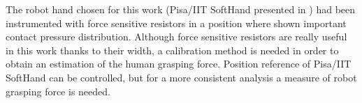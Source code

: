 The robot hand chosen for this work (Pisa/IIT SoftHand presented in \cite{catalano2014adaptive} ) had been instrumented with force sensitive resistors in a position where \cite{knoop2017handshakiness} shown important contact pressure distribution.
Although force sensitive resistors are really useful in this work thanks to their width, a calibration method is needed in order to obtain an estimation of the human grasping force. %
Position reference of Pisa/IIT SoftHand can be controlled, but for a more consistent analysis a measure of robot grasping force is needed. 